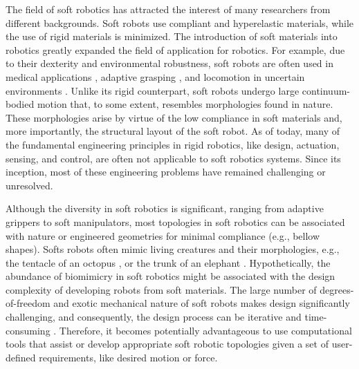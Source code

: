 The field of soft robotics has attracted the interest of many researchers from different backgrounds. Soft robots use compliant and hyperelastic materials, while the use of rigid materials is minimized. The introduction of soft materials into robotics greatly expanded the field of application for robotics. For example, due to their dexterity and environmental robustness, soft robots are often used in medical applications \cite{Polygerinos2015b, Yap2015, Asbeck2015}, adaptive grasping \cite{Galloway2016, Hughes2016}, and locomotion in uncertain environments \cite{Drotman2017}. Unlike its rigid counterpart, soft robots undergo large continuum-bodied motion that, to some extent, resembles morphologies found in nature. These morphologies arise by virtue of the low compliance in soft materials and, more importantly, the structural layout of the soft robot. As of today, many of the fundamental engineering principles in rigid robotics, like design, actuation, sensing, and control, are often not applicable to soft robotics systems. Since its inception, most of these engineering problems have remained challenging or unresolved.

Although the diversity in soft robotics is significant, ranging from adaptive grippers to soft manipulators, most topologies in soft robotics can be associated with nature or engineered geometries for minimal compliance (e.g., bellow shapes). Softs robots often mimic living creatures and their morphologies, e.g., the tentacle of an octopus \cite{Galloway2016, Wehner2016}, or the trunk of an elephant \cite{Drotman2017}. Hypothetically, the abundance of biomimicry in soft robotics might be associated with the design complexity of developing robots from soft materials. The large number of degrees-of-freedom and exotic mechanical nature of soft robots makes design significantly challenging, and consequently, the design process can be iterative and time-consuming \cite{Wehner2016}. Therefore, it becomes potentially advantageous to use computational tools that assist or develop appropriate soft robotic topologies given a set of user-defined requirements, like desired motion or force.

